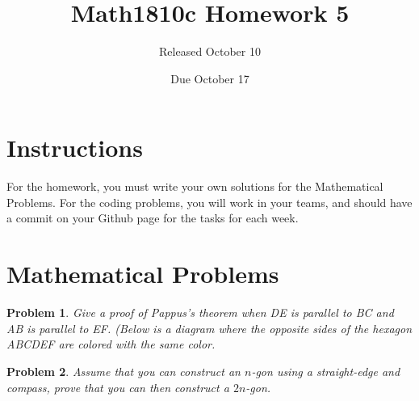 \documentclass{article}
\title{Math1810c Homework 5}
\author{Released October 10}
\date{Due October 17}
\newtheorem{problem}{Problem}
\begin{document}
\maketitle

\section{Instructions}

For the homework, you must write your own solutions for the Mathematical Problems. For the coding problems, you will work in your teams, and should have a commit on your Github page for the tasks for each week. 

\section{Mathematical Problems}

\begin{problem}
    Give a proof of Pappus's theorem when DE is parallel to BC and AB is parallel to EF. (Below is a diagram where the opposite sides of the hexagon ABCDEF are colored with the same color. 

\begin{center}
\end{center}
\end{problem}

\begin{problem}
    Assume that you can construct an $n$-gon using a straight-edge and compass, prove that you can then construct a $2n$-gon.
\end{problem}
\end{document}
